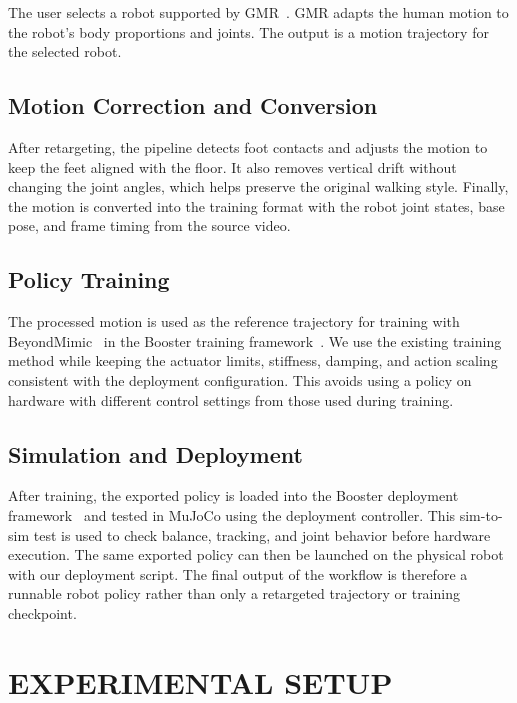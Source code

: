 \documentclass[letterpaper, 10 pt, conference]{ieeeconf}  %
\begin{document}
The user selects a robot supported by GMR~\cite{gmr}. GMR adapts the human motion to the robot's body proportions and joints. The output is a motion trajectory for the selected robot.

\subsection{Motion Correction and Conversion}

After retargeting, the pipeline detects foot contacts and adjusts the motion to keep the feet aligned with the floor. It also removes vertical drift without changing the joint angles, which helps preserve the original walking style. Finally, the motion is converted into the training format with the robot joint states, base pose, and frame timing from the source video.

\subsection{Policy Training}

The processed motion is used as the reference trajectory for training with BeyondMimic~\cite{beyondmimic} in the Booster training framework~\cite{boostertrain}. We use the existing training method while keeping the actuator limits, stiffness, damping, and action scaling consistent with the deployment configuration. This avoids using a policy on hardware with different control settings from those used during training.

\subsection{Simulation and Deployment}

After training, the exported policy is loaded into the Booster deployment framework~\cite{boosterdeploy} and tested in MuJoCo using the deployment controller. This sim-to-sim test is used to check balance, tracking, and joint behavior before hardware execution. The same exported policy can then be launched on the physical robot with our deployment script. The final output of the workflow is therefore a runnable robot policy rather than only a retargeted trajectory or training checkpoint.

\section{EXPERIMENTAL SETUP}
\end{document}
